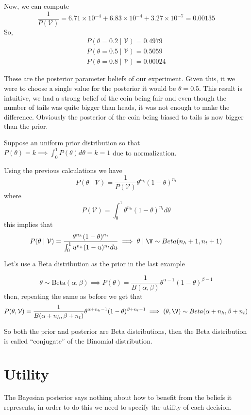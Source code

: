\begin{exampleth}
Now, we can compute
\[
   \frac{1}{P(\mathcal{V})} =  6.71\times10^{-4} +   6.83\times10^{-4} +
   3.27\times10^{-7} = 0.00135
 \]
 So,
\begin{gather*}
  P(\theta = 0.2  \mid  \mathcal{V}) = 0.4979\\
  P(\theta = 0.5  \mid  \mathcal{V}) = 0.5059\\
  P(\theta = 0.8  \mid  \mathcal{V}) = 0.00024
\end{gather*}

These are the posterior parameter beliefs of our experiment. Given this, it we
were to choose a single value for the posterior it would be \(\theta = 0.5\).
This result is intuitive, we had a strong belief of the coin being fair
and even though the number of tails was quite bigger than heads, it
was not enough to make the difference. Obviously the posterior of the coin being
biased to tails is now bigger than the prior.

Suppose an uniform prior distribution so that \(P(\theta) = k \implies \int_0^1 P(\theta) d\theta
= k = 1\) due to normalization.

Using the previous calculations we have
\[
  P(\theta \mid  \mathcal{V}) = \frac{1}{P(\mathcal{V})} \theta^{n_h}(1-\theta)^{n_t}
\]
where
\[
  P(\mathcal{V}) = \int_0^1 \theta^{n_h}(1-\theta)^{n_t} d\theta
\]
this implies that
\[
  P(\theta \mid \mathcal{V}) = \frac{\theta^{n_h}(1-\theta)^{n_t} }{ \int_0^1 u^{n_h}(1-u)^{n_t}
    du} \implies \theta \mid \V \sim Beta(n_h + 1, n_t + 1)
\]
\end{exampleth}

Let's use a Beta distribution as the prior in the last example

\[
  \theta \sim \text{Beta}(\alpha, \beta) \implies P(\theta) = \frac{1}{B(\alpha, \beta)}\theta^{\alpha - 1}(1 - \theta)^{\beta -
    1}
\]
then, repeating the same as before we get that
\[
  P(\theta, \mathcal{V}) = \frac{1}{B(\alpha + n_h, \beta + n_t)}\theta^{\alpha
    + n_h - 1}(1 - \theta)^{\beta + n_t - 1} \implies (\theta, \V) \sim Beta(\alpha + n_h, \beta + n_t)
\]

So both the prior and posterior are Beta distributions, then the Beta
distribution is called ``conjugate'' of the Binomial distribution.

\section{Utility}

The Bayesian posterior says nothing about how to benefit from the beliefs it
represents, in order to do this we need to specify the utility of each decision.

